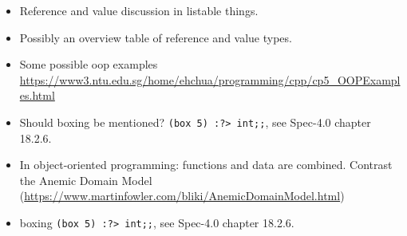 \documentclass[springer.tex]{subfiles}
\begin{document}
\begin{itemize}
\item Reference and value discussion in listable things.
\item Possibly an overview table of reference and value types.
\item Some possible oop examples \url{https://www3.ntu.edu.sg/home/ehchua/programming/cpp/cp5_OOPExamples.html}
\item Should boxing be mentioned? \lstinline|(box 5) :?> int;;|, see Spec-4.0 chapter 18.2.6.
\item In object-oriented programming: functions and data are combined. Contrast the Anemic Domain Model (\url{https://www.martinfowler.com/bliki/AnemicDomainModel.html})
\item boxing \lstinline|(box 5) :?> int;;|, see Spec-4.0 chapter 18.2.6.
\end{itemize}
\end{document}
